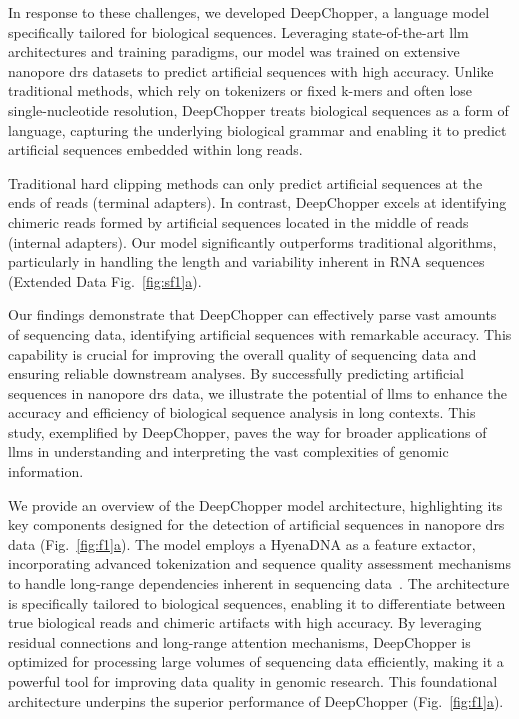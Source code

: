 \documentclass[pdflatex, sn-mathphys-num, lineno]{sn-jnl}%
\newcommand{\figref}[2]{Fig.~\hyperref[#1]{\ref*{#1}#2}}
\newcommand{\edfigref}[2]{Extended Data Fig.~\hyperref[#1]{\ref*{#1}#2}}
\theoremstyle{thmstyleone}%
\theoremstyle{thmstyletwo}%
\theoremstyle{thmstylethree}%
\begin{document}
In response to these challenges, we developed DeepChopper, a language model specifically tailored for biological sequences.
Leveraging state-of-the-art \gls{llm} architectures and training paradigms, our model was trained on extensive nanopore \gls{drs} datasets to predict artificial sequences with high accuracy.
Unlike traditional methods, which rely on tokenizers or fixed k-mers and often lose single-nucleotide resolution, DeepChopper treats biological sequences as a form of language, capturing the underlying biological grammar and enabling it to predict artificial sequences embedded within long reads.

Traditional hard clipping methods can only predict artificial sequences at the ends of reads (terminal adapters).
In contrast, DeepChopper excels at identifying chimeric reads formed by artificial sequences located in the middle of reads (internal adapters).
Our model significantly outperforms traditional algorithms, particularly in handling the length and variability inherent in RNA sequences (\edfigref{fig:sf1}{a}).

Our findings demonstrate that DeepChopper can effectively parse vast amounts of sequencing data, identifying artificial sequences with remarkable accuracy.
This capability is crucial for improving the overall quality of sequencing data and ensuring reliable downstream analyses.
By successfully predicting artificial sequences in nanopore \gls{drs} data, we illustrate the potential of \glspl{llm} to enhance the accuracy and efficiency of biological sequence analysis in long contexts.
This study, exemplified by DeepChopper, paves the way for broader applications of \glspl{llm} in understanding and interpreting the vast complexities of genomic information.



We provide an overview of the DeepChopper model architecture, highlighting its key components designed for the detection of artificial sequences in nanopore \gls{drs} data (\figref{fig:f1}{a}).
The model employs a HyenaDNA as a feature extactor, incorporating advanced tokenization and sequence quality assessment mechanisms to handle long-range dependencies inherent in sequencing data~\cite{nguyen2024hyenadna}.
The architecture is specifically tailored to biological sequences, enabling it to differentiate between true biological reads and chimeric artifacts with high accuracy.
By leveraging residual connections and long-range attention mechanisms, DeepChopper is optimized for processing large volumes of sequencing data efficiently, making it a powerful tool for improving data quality in genomic research.
This foundational architecture underpins the superior performance of DeepChopper (\figref{fig:f1}{a}).
\end{document}
